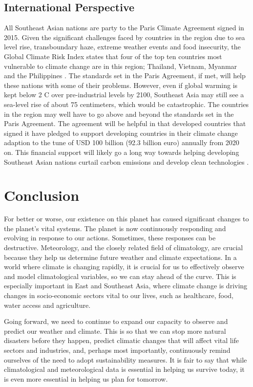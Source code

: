 \subsection{International Perspective}

All Southeast Asian nations are party to the Paris Climate Agreement signed in 2015. Given the significant challenges faced by countries in the region due to sea level rise, transboundary haze, extreme weather events and food insecurity, the Global Climate Risk Index states that four of the top ten countries most vulnerable to climate change are in this region; Thailand, Vietnam, Myanmar and the Philippines \citep{WRIasean}. The standards set in the Paris Agreement, if met, will help these nations with some of their problems. However, even if global warming is kept below 2 \degree C over pre-industrial levels by 2100, Southeast Asia may still see a sea-level rise of about 75 centimeters, which would be catastrophic. The countries in the region may well have to go above and beyond the standards set in the Paris Agreement. The agreement will be helpful in that developed countries that signed it have pledged to support developing countries in their climate change adaption to the tune of USD 100 billion (92.3 billion euro) annually from 2020 on. This financial support will likely go a long way towards helping developing Southeast Asian nations curtail carbon emissions and develop clean technologies \citep{DW2015}. 

\section{Conclusion}
For better or worse, our existence on this planet has caused significant changes to the planet's vital systems. The planet is now continuously responding and evolving in response to our actions. Sometimes, these responses can be destructive. Meteorology, and the closely related field of climatology, are crucial because they help us determine future weather and climate expectations. In a world where climate is changing rapidly, it is crucial for us to effectively observe and model climatological variables, so we can stay ahead of the curve. This is especially important in East and Southeast Asia, where climate change is driving changes in socio-economic sectors vital to our lives, such as healthcare, food, water access and agriculture.
 
Going forward, we need to continue to expand our capacity to observe and predict our weather and climate. This is so that we can stop more natural disasters before they happen, predict climatic changes that will affect vital life sectors and industries, and, perhaps most importantly, continuously remind ourselves of the need to adopt sustainability measures. It is fair to say that while climatological and meteorological data is essential in helping us survive today, it is even more essential in helping us plan for tomorrow. 

